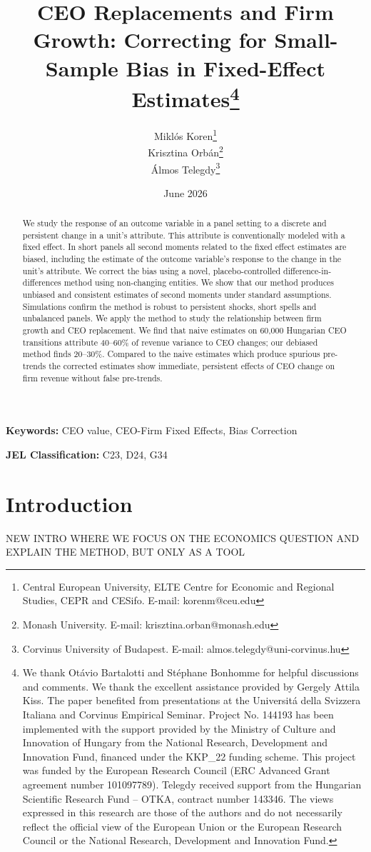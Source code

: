 \documentclass[11pt,a4paper]{article}
\title{CEO Replacements and Firm Growth: Correcting for Small-Sample Bias in Fixed-Effect Estimates\thanks{We thank Ot\'{a}vio Bartalotti and St\'ephane Bonhomme for helpful discussions and comments.  We thank the excellent assistance provided by Gergely Attila Kiss. The paper benefited from presentations at the Universit\'a della Svizzera Italiana and Corvinus Empirical Seminar. Project No. 144193 has been implemented with the support provided by the Ministry of Culture and Innovation of Hungary from the National Research, Development and Innovation Fund, financed under the KKP\_22 funding scheme. This project was funded by the European Research Council (ERC Advanced Grant agreement number 101097789). Telegdy received support from the Hungarian Scientific Research Fund – OTKA, contract number 143346. The views expressed in this research are those of the authors and do not necessarily reflect the official view of the European Union or the European Research Council or the National Research, Development and Innovation Fund.}}
\author{Miklós Koren\thanks{Central European University, ELTE Centre for Economic and Regional Studies, CEPR and CESifo. E-mail: korenm@ceu.edu} \\
        Krisztina Orbán\thanks{Monash University. E-mail: krisztina.orban@monash.edu} \\
        Álmos Telegdy\thanks{Corvinus University of Budapest. E-mail: almos.telegdy@uni-corvinus.hu}}
\date{June 2026}
\begin{document}
\maketitle
\thispagestyle{empty}

\begin{abstract}
\noindent
We study the response of an outcome variable in a panel setting to a discrete and persistent change in a unit's attribute. This attribute is conventionally modeled with a fixed effect. In short panels all second moments related to the fixed effect estimates are biased, including the estimate of the outcome variable's response to the change in the unit's attribute. We correct the bias using a novel, placebo-controlled difference-in-differences method using non-changing entities. We show that our method produces unbiased and consistent estimates of second moments under standard assumptions. Simulations confirm the  method is robust to persistent shocks, short spells and unbalanced panels. We apply the method to study the relationship between firm growth and CEO replacement. We find that naive estimates on 60,000 Hungarian CEO transitions attribute 40–60\% of revenue variance to CEO changes; our debiased method finds 20–30\%. Compared to the naive estimates which produce spurious pre-trends the corrected estimates show immediate, persistent effects of CEO change on firm revenue without false pre-trends.

\end{abstract}

\textbf{Keywords:} CEO value, CEO-Firm Fixed Effects, Bias Correction

\textbf{JEL Classification:} C23, D24, G34

\clearpage
\setcounter{page}{1}

\section{Introduction}

NEW INTRO WHERE WE FOCUS ON THE ECONOMICS QUESTION AND EXPLAIN THE METHOD, BUT ONLY AS A TOOL
\end{document}
